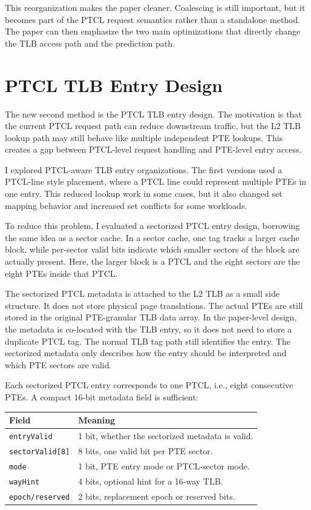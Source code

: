 \documentclass[11pt]{article}
\begin{document}
This reorganization makes the paper cleaner. Coalescing is still important, but
it becomes part of the PTCL request semantics rather than a standalone method.
The paper can then emphasize the two main optimizations that directly change
the TLB access path and the prediction path.

\section{PTCL TLB Entry Design}

The new second method is the PTCL TLB entry design. The motivation is that the
current PTCL request path can reduce downstream traffic, but the L2 TLB lookup
path may still behave like multiple independent PTE lookups. This creates a gap
between PTCL-level request handling and PTE-level entry access.

I explored PTCL-aware TLB entry organizations. The first versions used a
PTCL-line style placement, where a PTCL line could represent multiple PTEs in
one entry. This reduced lookup work in some cases, but it also changed set
mapping behavior and increased set conflicts for some workloads.

To reduce this problem, I evaluated a sectorized PTCL entry design, borrowing
the same idea as a sector cache. In a sector cache, one tag tracks a larger cache
block, while per-sector valid bits indicate which smaller sectors of the block
are actually present. Here, the larger block is a PTCL and the eight sectors are
the eight PTEs inside that PTCL.

The sectorized PTCL metadata is attached to the L2 TLB as a small side
structure. It does not store physical page translations. The actual PTEs are
still stored in the original PTE-granular TLB data array. In the paper-level
design, the metadata is co-located with the TLB entry, so it does not need to
store a duplicate PTCL tag. The normal TLB tag path still identifies the entry.
The sectorized metadata only describes how the entry should be interpreted and
which PTE sectors are valid.

Each sectorized PTCL entry corresponds to one PTCL, i.e., eight consecutive
PTEs. A compact 16-bit metadata field is sufficient:

\begin{center}
\begin{tabular}{ll}
\toprule
Field & Meaning \\
\midrule
\texttt{entryValid} & 1 bit, whether the sectorized metadata is valid. \\
\texttt{sectorValid[8]} & 8 bits, one valid bit per PTE sector. \\
\texttt{mode} & 1 bit, PTE entry mode or PTCL-sector mode. \\
\texttt{wayHint} & 4 bits, optional hint for a 16-way TLB. \\
\texttt{epoch/reserved} & 2 bits, replacement epoch or reserved bits. \\
\bottomrule
\end{tabular}
\end{center}
\end{document}
